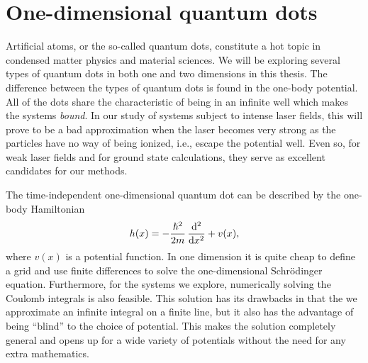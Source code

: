 \section{One-dimensional quantum dots}
    \label{sec:one-dim-ho}
    Artificial atoms, or the so-called quantum dots, constitute a hot topic in
    condensed matter physics and material sciences. We will be exploring
    several types of quantum dots in both one and two dimensions in this
    thesis. The difference between the types of quantum dots is found in the
    one-body potential. All of the dots share the characteristic of being in an
    infinite well which makes the systems \emph{bound}. In our study of systems
    subject to intense laser fields, this will prove to be a bad approximation
    when the laser becomes very strong as the particles have no way of being
    ionized, i.e., escape the potential well.  Even so, for weak laser fields
    and for ground state calculations, they serve as excellent candidates for
    our methods.

    The time-independent one-dimensional quantum dot can be described by the
    one-body Hamiltonian
    \begin{align}
        \oneten(x)
        = -\frac{\hslash^2}{2m} \dod[2]{}{x}
        + v(x),
        \label{eq:one-body-odqd}
    \end{align}
    where $v(x)$ is a potential function.
    In one dimension it is quite cheap to define a grid and use finite
    differences to solve the one-dimensional Schrödinger equation.
    Furthermore, for the systems we explore, numerically solving the Coulomb
    integrals is also feasible.
    This solution has its drawbacks in that the we approximate an infinite
    integral on a finite line, but it also has the advantage of being ``blind''
    to the choice of potential.
    This makes the solution completely general and opens up for a wide variety
    of potentials without the need for any extra mathematics.

